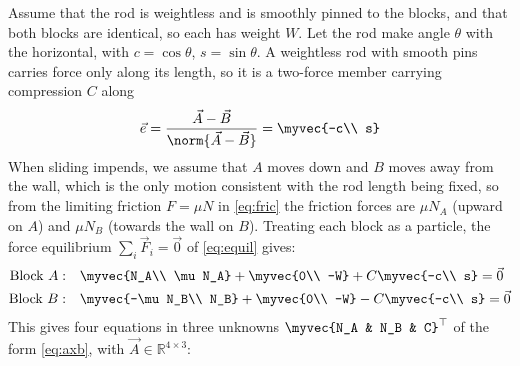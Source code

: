 \begin{enumerate}[label=\thesubsection.\arabic*, ref=\thesubsection.\theenumi, itemsep=0pt, leftmargin=*]
\begin{center}
\end{center}
\solution Assume that the rod is weightless and is smoothly pinned to the blocks, and that both blocks are identical, so each has weight $W$. Let the rod make angle $\theta$ with the horizontal, with $c = \cos\theta$, $s = \sin\theta$. A weightless rod with smooth pins carries force only along its length, so it is a two-force member carrying compression $C$ along
\begin{align}
\vec{e} = \frac{\vec{A} - \vec{B}}{\norm{\vec{A} - \vec{B}}} = \myvec{-c\\ s}
\end{align}
When sliding impends, we assume that $A$ moves down and $B$ moves away from the wall, which is the only motion consistent with the rod length being fixed, so from the limiting friction $F = \mu N$ in \eqref{eq:fric} the friction forces are $\mu N_A$ (upward on $A$) and $\mu N_B$ (towards the wall on $B$). Treating each block as a particle, the force equilibrium $\sum_i\vec{F}_i = \vec{0}$ of \eqref{eq:equil} gives:
\begin{align}
\text{Block }A:&\quad \myvec{N_A\\ \mu N_A} + \myvec{0\\ -W} + C\myvec{-c\\ s} = \vec{0}\\
\text{Block }B:&\quad \myvec{-\mu N_B\\ N_B} + \myvec{0\\ -W} - C\myvec{-c\\ s} = \vec{0}
\end{align}
This gives four equations in three unknowns $\myvec{N_A & N_B & C}^\top$ of the form \eqref{eq:axb}, with $\vec{A} \in \mathbb{R}^{4\times 3}$:
\begin{align}

\end{align}
\end{enumerate}
